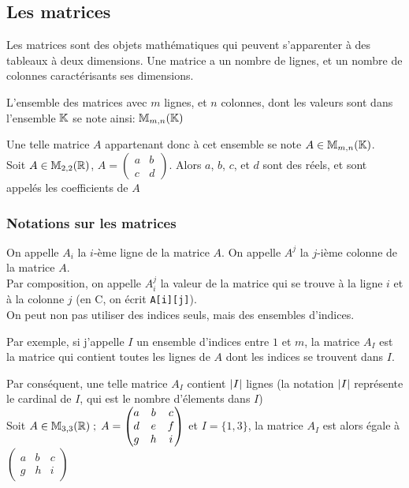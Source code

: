 \documentclass[a4paper, 11pt]{article}
\begin{document}
\newpage

\subsection{Les matrices}

Les matrices sont des objets mathématiques qui peuvent s'apparenter à des tableaux à deux dimensions.
Une matrice a un nombre de lignes, et un nombre de colonnes caractérisants ses dimensions.

L'ensemble des matrices avec $m$ lignes, et $n$ colonnes, dont les valeurs sont dans l'ensemble $\mathbb{K}$ se note ainsi: $\mathbb{M}_{m,n}(\mathbb{K})$

Une telle matrice $A$ appartenant donc à cet ensemble se note $A \in \mathbb{M}_{m,n}(\mathbb{K})$. \\

Soit $A \in \mathbb{M}_{2,2}(\mathbb{R})$, $A = \begin{pmatrix} a & b \\ c & d \end{pmatrix}$.
Alors $a$, $b$, $c$, et $d$ sont des réels, et sont appelés les coefficients de $A$

\subsubsection{Notations sur les matrices}

On appelle $A_i$ la $i$-ème ligne de la matrice $A$.
On appelle $A^{j}$ la $j$-ième colonne de la matrice $A$. \\

Par composition, on appelle $A_{i}^{j}$ la valeur de la matrice qui se trouve
à la ligne $i$ et à la colonne $j$ (en C, on écrit \texttt{A[i][j]}). \\

On peut non pas utiliser des indices seuls, mais des ensembles d'indices.

Par exemple, si j'appelle $I$ un ensemble d'indices entre $1$ et $m$,
la matrice $A_{I}$ est la matrice qui contient toutes les lignes de $A$
dont les indices se trouvent dans $I$.

Par conséquent, une telle matrice $A_{I}$ contient $\lvert I \lvert$ lignes
(la notation $\lvert I \lvert$ représente le cardinal de $I$, qui est le nombre d'élements
dans $I$) \\

Soit $A \in \mathbb{M}_{3,3}(\mathbb{R}) \; ; \; A = \begin{pmatrix} a&b&c\\d&e&f\\g&h&i\end{pmatrix}$
et $I = \{1, 3\}$, la matrice $A_{I}$ est alors égale à $\begin{pmatrix}a&b&c\\g&h&i\end{pmatrix}$ \\
\end{document}
